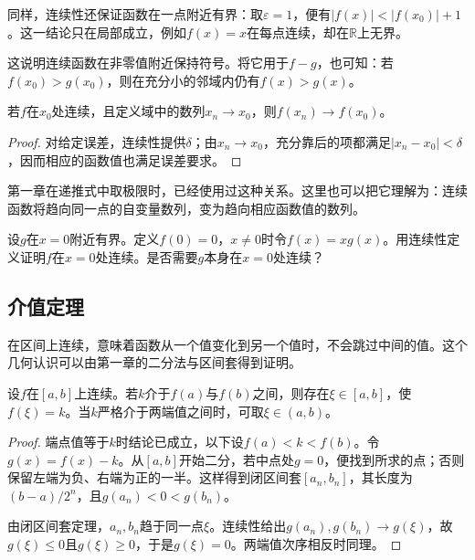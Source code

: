 同样，连续性还保证函数在一点附近有界：取\(\varepsilon=1\)，便有\(|f(x)|<|f(x_0)|+1\)。这一结论只在局部成立，例如\(f(x)=x\)在每点连续，却在\(\mathbb R\)上无界。

这说明连续函数在非零值附近保持符号。将它用于\(f-g\)，也可知：若\(f(x_0)>g(x_0)\)，则在充分小的邻域内仍有\(f(x)>g(x)\)。

\begin{proposition}\label{prop:functions-continuity-sequence}
若\(f\)在\(x_0\)处连续，且定义域中的数列\(x_n\to x_0\)，则\(f(x_n)\to f(x_0)\)。
\end{proposition}

\begin{proof}
对给定误差，连续性提供\(\delta\)；由\(x_n\to x_0\)，充分靠后的项都满足\(|x_n-x_0|<\delta\)，因而相应的函数值也满足误差要求。
\end{proof}

第一章在递推式中取极限时，已经使用过这种关系。这里也可以把它理解为：连续函数将趋向同一点的自变量数列，变为趋向相应函数值的数列。

\begin{example}
设\(g\)在\(x=0\)附近有界。定义\(f(0)=0\)，\(x\ne0\)时令\(f(x)=xg(x)\)。用连续性定义证明\(f\)在\(x=0\)处连续。是否需要\(g\)本身在\(x=0\)处连续？
\end{example}

\subsection{介值定理}
\label{subsec:functions-intermediate-value}

在区间上连续，意味着函数从一个值变化到另一个值时，不会跳过中间的值。这个几何认识可以由第一章的二分法与区间套得到证明。

\begin{theorem}[介值定理]\label{thm:functions-intermediate-value}
设\(f\)在\([a,b]\)上连续。若\(k\)介于\(f(a)\)与\(f(b)\)之间，则存在\(\xi\in[a,b]\)，使\(f(\xi)=k\)。当\(k\)严格介于两端值之间时，可取\(\xi\in(a,b)\)。
\end{theorem}

\begin{proof}
端点值等于\(k\)时结论已成立，以下设\(f(a)<k<f(b)\)。令\(g(x)=f(x)-k\)。从\([a,b]\)开始二分，若中点处\(g=0\)，便找到所求的点；否则保留左端为负、右端为正的一半。这样得到闭区间套\([a_n,b_n]\)，其长度为\((b-a)/2^n\)，且\(g(a_n)<0<g(b_n)\)。

由闭区间套定理，\(a_n,b_n\)趋于同一点\(\xi\)。连续性给出\(g(a_n),g(b_n)\to g(\xi)\)，故\(g(\xi)\le0\)且\(g(\xi)\ge0\)，于是\(g(\xi)=0\)。两端值次序相反时同理。
\end{proof}


